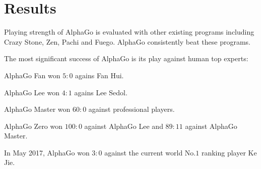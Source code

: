 \documentclass[11pt]{article} %
\begin{document}
\section{Results}

Playing strength of AlphaGo is evaluated with other existing programs including Crazy Stone, Zen, Pachi and Fuego. AlphaGo consistently beat these programs. 

The most significant success of AlphaGo is its play against human top experts:

AlphaGo Fan won $5:0$ agains Fan Hui.

AlphaGo Lee won $4:1$ agains Lee Sedol.

AlphaGo Master won $60:0$ against professional players.

AlphaGo Zero won $100:0$ against AlphaGo Lee and $89:11$ against AlphaGo Master.

In May 2017, AlphaGo won $3:0$ against the current world No.$1$ ranking player Ke Jie.
\end{document}
